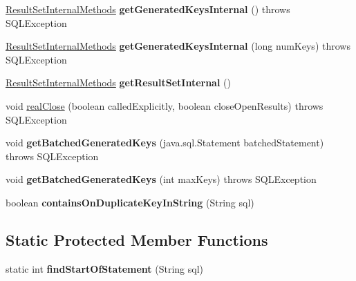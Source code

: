 \begin{DoxyCompactItemize}
\mbox{\hyperlink{interfacecom_1_1mysql_1_1cj_1_1jdbc_1_1result_1_1_result_set_internal_methods}{Result\+Set\+Internal\+Methods}} {\bfseries get\+Generated\+Keys\+Internal} ()  throws S\+Q\+L\+Exception 
\item 
\mbox{\label{classcom_1_1mysql_1_1cj_1_1jdbc_1_1_statement_impl_a290944a1b4c5ccf73dcbad92fa755808}} 
\mbox{\hyperlink{interfacecom_1_1mysql_1_1cj_1_1jdbc_1_1result_1_1_result_set_internal_methods}{Result\+Set\+Internal\+Methods}} {\bfseries get\+Generated\+Keys\+Internal} (long num\+Keys)  throws S\+Q\+L\+Exception 
\item 
\mbox{\label{classcom_1_1mysql_1_1cj_1_1jdbc_1_1_statement_impl_a9e9be16d68c66d0ad86147417269fee3}} 
\mbox{\hyperlink{interfacecom_1_1mysql_1_1cj_1_1jdbc_1_1result_1_1_result_set_internal_methods}{Result\+Set\+Internal\+Methods}} {\bfseries get\+Result\+Set\+Internal} ()
\item 
void \mbox{\hyperlink{classcom_1_1mysql_1_1cj_1_1jdbc_1_1_statement_impl_aea1b46dca9271ff10f7e65ba92c224fa}{real\+Close}} (boolean called\+Explicitly, boolean close\+Open\+Results)  throws S\+Q\+L\+Exception 
\item 
\mbox{\label{classcom_1_1mysql_1_1cj_1_1jdbc_1_1_statement_impl_af9a603cba639540f2cb9c6d998cf149e}} 
void {\bfseries get\+Batched\+Generated\+Keys} (java.\+sql.\+Statement batched\+Statement)  throws S\+Q\+L\+Exception 
\item 
\mbox{\label{classcom_1_1mysql_1_1cj_1_1jdbc_1_1_statement_impl_ae919819a2a02e89738113125b950d694}} 
void {\bfseries get\+Batched\+Generated\+Keys} (int max\+Keys)  throws S\+Q\+L\+Exception 
\item 
\mbox{\label{classcom_1_1mysql_1_1cj_1_1jdbc_1_1_statement_impl_a4731b8a25ed40cab2a2f5f238eba7a2a}} 
boolean {\bfseries contains\+On\+Duplicate\+Key\+In\+String} (String sql)
\end{DoxyCompactItemize}
\subsection*{Static Protected Member Functions}
\begin{DoxyCompactItemize}
\item 
\mbox{\label{classcom_1_1mysql_1_1cj_1_1jdbc_1_1_statement_impl_a7b294b3903bade079f3fb8addee17ab7}} 
static int {\bfseries find\+Start\+Of\+Statement} (String sql)
\end{DoxyCompactItemize}
